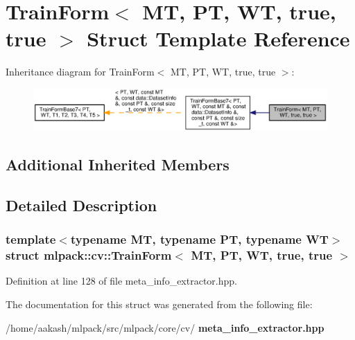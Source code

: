 \section{Train\+Form$<$ MT, PT, WT, true, true $>$ Struct Template Reference}
\label{structmlpack_1_1cv_1_1TrainForm_3_01MT_00_01PT_00_01WT_00_01true_00_01true_01_4}


Inheritance diagram for Train\+Form$<$ MT, PT, WT, true, true $>$\+:
\nopagebreak
\begin{figure}[H]
\begin{center}
\leavevmode
\includegraphics[width=350pt]{structmlpack_1_1cv_1_1TrainForm_3_01MT_00_01PT_00_01WT_00_01true_00_01true_01_4__inherit__graph}
\end{center}
\end{figure}
\subsection*{Additional Inherited Members}


\subsection{Detailed Description}
\subsubsection*{template$<$typename MT, typename PT, typename WT$>$\newline
struct mlpack\+::cv\+::\+Train\+Form$<$ M\+T, P\+T, W\+T, true, true $>$}



Definition at line 128 of file meta\+\_\+info\+\_\+extractor.\+hpp.



The documentation for this struct was generated from the following file\+:\begin{DoxyCompactItemize}
\item 
/home/aakash/mlpack/src/mlpack/core/cv/\textbf{ meta\+\_\+info\+\_\+extractor.\+hpp}\end{DoxyCompactItemize}
